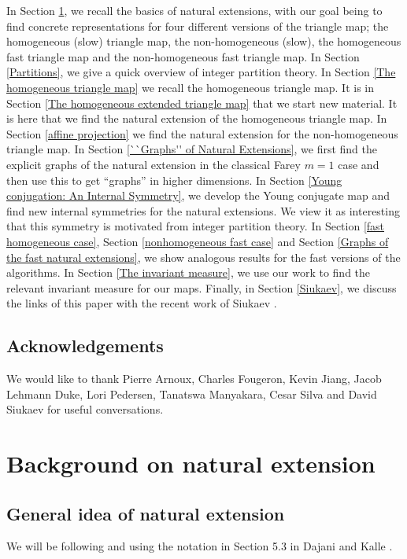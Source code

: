 \documentclass[12pt,oneside,openany]{article}
\begin{document}
In Section \ref{natural extension}, we recall the basics of natural extensions, with  our goal being to find concrete representations for four different versions of the triangle map; the homogeneous (slow) triangle map, the non-homogeneous (slow), the homogeneous fast triangle map and the non-homogeneous fast triangle map. In Section \ref{Partitions}, we give a quick overview of integer partition theory.  In Section \ref{The homogeneous triangle map} we recall the homogeneous triangle map.  It is in Section \ref{The homogeneous extended triangle map} that we start new material.  It is here that we find the natural extension of the homogeneous triangle map. In Section \ref{affine projection} we find the natural extension for the non-homogeneous triangle map.  In Section \ref{``Graphs'' of Natural Extensions}, we first find the explicit graphs of the natural extension in the classical Farey $m=1$ case  and then use this to get ``graphs'' in higher dimensions.  In Section \ref{Young conjugation: An Internal Symmetry}, we develop the Young conjugate map and find new internal symmetries for the natural extensions.  We view it as  interesting that this symmetry is motivated from integer partition theory.  In Section \ref{fast homogeneous case}, Section \ref{nonhomogeneous fast case}  and  Section \ref{Graphs of the fast natural extensions}, we show analogous results for the fast versions of the algorithms.  In Section \ref{The invariant measure}, we use our work to find the relevant invariant measure for our maps.  Finally, in Section \ref{Siukaev}, we discuss the links of this paper with the recent work of Siukaev \cite{Siukaev}. 



\subsection{Acknowledgements} 
We would like to thank Pierre Arnoux, Charles Fougeron, Kevin Jiang, Jacob Lehmann Duke, Lori Pedersen, Tanatswa Manyakara, Cesar Silva and David Siukaev for useful conversations.








\section{Background on natural extension}\label{natural extension}

\subsection{General idea of natural extension}\label{basics of natural extension}
We will be following and using the notation in Section 5.3 in Dajani and Kalle \cite{Dajani-Kalle}.
\end{document}
